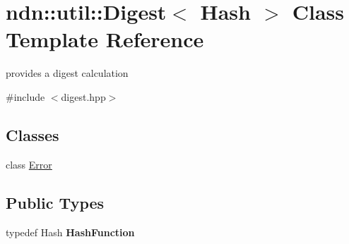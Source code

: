 \hypertarget{classndn_1_1util_1_1Digest}{}\section{ndn\+:\+:util\+:\+:Digest$<$ Hash $>$ Class Template Reference}
\label{classndn_1_1util_1_1Digest}


provides a digest calculation  




{\ttfamily \#include $<$digest.\+hpp$>$}

\subsection*{Classes}
\begin{DoxyCompactItemize}
\item 
class \hyperlink{classndn_1_1util_1_1Digest_1_1Error}{Error}
\end{DoxyCompactItemize}
\subsection*{Public Types}
\begin{DoxyCompactItemize}
\item 
typedef Hash {\bfseries Hash\+Function}\hypertarget{classndn_1_1util_1_1Digest_a3f72a073f84f1c612322c0163421f6d5}{}\label{classndn_1_1util_1_1Digest_a3f72a073f84f1c612322c0163421f6d5}

\end{DoxyCompactItemize}
